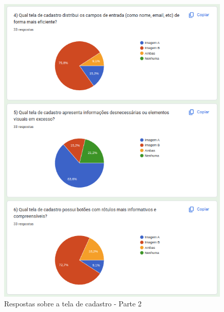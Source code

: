 \begin{figure}[!h]
	\begin{center}
	    \includegraphics[scale=0.7]{figs/Answers/Students/09.png}
	\end{center}
	\caption{\label{APB_TC02}Respostas sobre a tela de cadastro - Parte 2}
\end{figure}

\newpage

